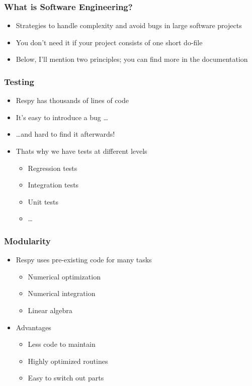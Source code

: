 \documentclass[11pt]{beamer}
\begin{document}
\begin{frame}[c]\frametitle{What is Software Engineering?}
    \begin{itemize}
        \item Strategies to handle complexity and avoid bugs in large software projects
        \item You don't need it if your project consists of one short do-file %

        \item Below, I'll mention two principles; you can find more in the documentation
    \end{itemize}
\end{frame}



\begin{frame}[c]\frametitle{Testing}
\begin{itemize}
  \item Respy has thousands of lines of code
  \item It's easy to introduce a bug \ldots
  \item[] \hspace{2cm} \ldots and hard to find it afterwards!
  \item Thats why we have tests at different levels
  \begin{itemize}
    \item Regression tests
    \item Integration tests
    \item Unit tests
    \item \ldots
  \end{itemize}
\end{itemize}
\end{frame}



\begin{frame}[t]\frametitle{Modularity}
  \begin{itemize}
    \item Respy uses pre-existing code for many tasks
    \begin{itemize}
      \item Numerical optimization
      \item Numerical integration
      \item Linear algebra
    \end{itemize}
    \item Advantages
    \begin{itemize}
      \item Less code to maintain
      \item Highly optimized routines
      \item Easy to switch out parts
    \end{itemize}
  \end{itemize}
\end{frame}
\end{document}
